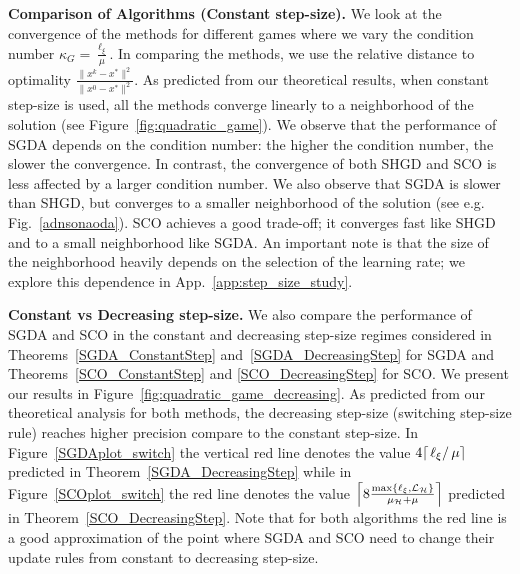\documentclass{article}
\begin{document}
\textbf{Comparison of Algorithms (Constant step-size).}  We look at the convergence of the methods for different games where we vary the condition number $\kappa_G=\frac{\ell_\xi}{\mu}$. In comparing the methods, we use the relative distance to optimality $\frac{\|x^k-x^*\|^2}{\|x^0-x^*\|^2}$. As predicted from our theoretical results, when constant step-size is used, all the methods converge linearly to a neighborhood of the solution (see Figure~\ref{fig:quadratic_game}). We observe that the performance of SGDA depends on the condition number: the higher the condition number, the slower the convergence. In contrast, the convergence of both SHGD and SCO is less affected by a larger condition number. We also observe that SGDA is slower than SHGD, but converges to a smaller neighborhood of the solution (see e.g. Fig.~\ref{adnsonaoda}). SCO achieves a good trade-off; it converges fast like SHGD and to a small neighborhood like SGDA. An important note is that the size of the neighborhood heavily depends on the selection of the learning rate; we explore this dependence in App.~\ref{app:step_size_study}.

\textbf{Constant vs Decreasing step-size.} We also compare the performance of SGDA and SCO in the constant and decreasing step-size regimes considered in Theorems~\ref{SGDA_ConstantStep} and~\ref{SGDA_DecreasingStep} for SGDA  and Theorems~\ref{SCO_ConstantStep} and \ref{SCO_DecreasingStep} for SCO. We present our results in Figure~\ref{fig:quadratic_game_decreasing}. As predicted from our theoretical analysis for both methods, the decreasing step-size (switching step-size rule) reaches higher precision compare to the constant step-size. In Figure~\ref{SGDAplot_switch} the vertical red line denotes the value $4\lceil \left.\ell_\xi\right/\mu \rceil$ predicted in Theorem~\ref{SGDA_DecreasingStep}  while in Figure~\ref{SCOplot_switch} the red line denotes the value $\left\lceil 8 \frac{\max\{  \ell_{\xi},{\cal L}_{{\cal H}}\}}{\mu_{{\cal H}}+\mu} \right\rceil$ predicted in Theorem~\ref{SCO_DecreasingStep}. Note that for both algorithms the red line is a good approximation of the point where SGDA and SCO need to change their update rules from constant to decreasing step-size.
\vspace{-2mm}
\end{document}
